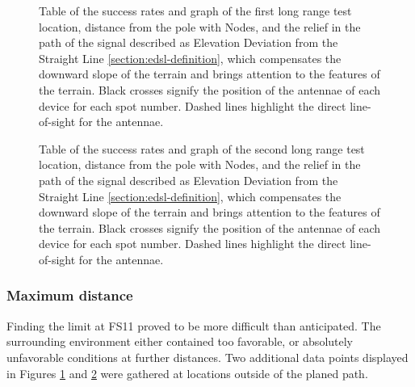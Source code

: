 \begin{figure}[p]
    \centering
    \begin{minipage}[t]{\textwidth}
        \centering
        
        \vspace{1em}
    \end{minipage}
    
    \caption{\label{fig:range-relief-far1}Table of the success rates and graph of the first long range test location, distance from the pole with Nodes, and the relief in the path of the signal described as Elevation Deviation from the Straight Line \ref{section:edsl-definition}, which compensates the downward slope of the terrain and brings attention to the features of the terrain. Black crosses signify the position of the antennae of each device for each spot number. Dashed lines highlight the direct line-of-sight for the antennae.}
\end{figure}

\begin{figure}[p]
    \centering
    \begin{minipage}[t]{\textwidth}
        \centering
        
        \vspace{1em}
    \end{minipage}
    
    \caption{\label{fig:range-relief-far2}Table of the success rates and graph of the second long range test location, distance from the pole with Nodes, and the relief in the path of the signal described as Elevation Deviation from the Straight Line \ref{section:edsl-definition}, which compensates the downward slope of the terrain and brings attention to the features of the terrain. Black crosses signify the position of the antennae of each device for each spot number. Dashed lines highlight the direct line-of-sight for the antennae.}
\end{figure}

\subsubsection{Maximum distance}
Finding the limit at FS11 proved to be more difficult than anticipated. The surrounding environment either contained too favorable, or absolutely unfavorable conditions at further distances. Two additional data points displayed in Figures \ref{fig:range-relief-far1} and \ref{fig:range-relief-far2} were gathered at locations outside of the planed path.

